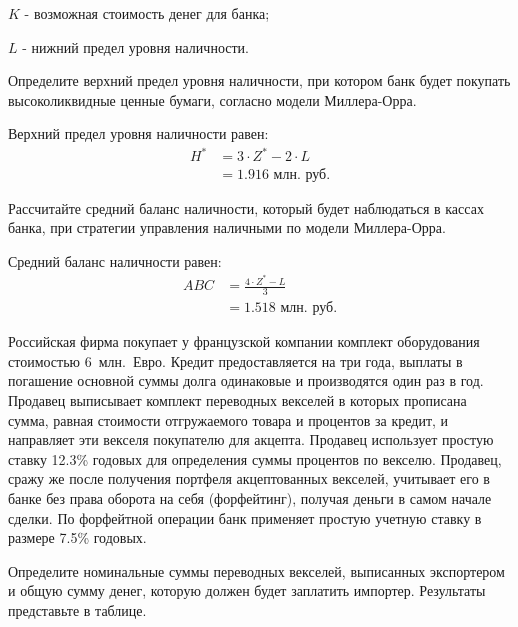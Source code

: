 \documentclass[12pt, table]{exam}
\begin{document}
\begin{questions}
\begin{subparts}
\begin{solution}[6em]
		$K$ - возможная стоимость денег для банка;
		
		$L$ - нижний предел уровня наличности.
		
	\end{solution}
	
	\subpart[5] Определите верхний предел уровня наличности, при котором банк будет покупать высоколиквидные ценные бумаги, согласно модели Миллера-Орра.
	\begin{solution}[6em] 
		Верхний предел уровня наличности равен:
		\begin{align}
		H^*&=3 \cdot Z^* - 2 \cdot L\\
		&=1.916\text{~млн.~руб.}\nonumber
		\end{align}
	\end{solution}
	
	\subpart[5] Рассчитайте средний баланс наличности, который будет наблюдаться в кассах банка, при стратегии управления наличными по модели Миллера-Орра.
	\begin{solution}[6em]
		Средний баланс наличности равен:
		\begin{align}
		ABC&=\frac{4 \cdot Z^*-L}{3}\\
		&=1.518\text{~млн.~руб.}\nonumber
		\end{align}	
	\end{solution}
	
\end{subparts}
\addpoints

\question[20] Российская фирма покупает у французской компании комплект оборудования стоимостью 6~млн.~Евро. Кредит предоставляется на три года, выплаты в погашение основной суммы долга одинаковые и производятся один раз в год.
Продавец выписывает комплект переводных векселей в которых прописана сумма, равная стоимости отгружаемого товара и процентов за кредит, и направляет эти векселя покупателю для акцепта. Продавец использует простую ставку 12.3\% годовых для определения суммы процентов по векселю. 
Продавец, сражу же после получения портфеля акцептованных векселей, учитывает его в банке без права оборота на себя (форфейтинг), получая деньги в самом начале сделки. По форфейтной операции банк применяет простую учетную ставку в размере 7.5\% годовых.

\noaddpoints

\begin{subparts}
	\subpart[5] Определите номинальные суммы переводных векселей, выписанных экспортером и общую сумму денег, которую должен будет заплатить импортер. Результаты представьте в таблице.
	

\end{subparts}
\end{questions}
\end{document}
